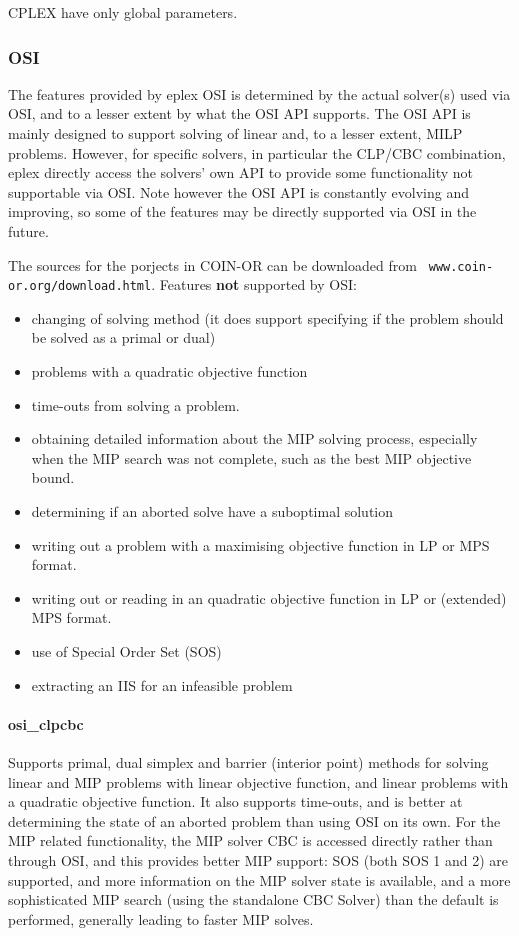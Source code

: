 CPLEX have only global parameters.
  
\subsubsection{OSI}
The features provided by eplex OSI is determined by the actual
solver(s) used via OSI, and to a lesser extent by what the OSI API
supports. The OSI API is mainly designed to support solving of 
linear and, to a lesser extent, MILP problems. However, for specific
solvers, in particular the CLP/CBC combination, eplex
directly access the solvers' own API to provide some functionality not
supportable via OSI. Note however the OSI API is constantly evolving and
improving, so some of the features may be directly supported via OSI in the
future. 

The sources for the porjects in COIN-OR can be downloaded from {\tt
www.coin-or.org/download.html}. 
Features {\bf not} supported by OSI: 
\begin{itemize}
\item changing of solving method (it does support specifying if the problem
should be solved as a primal or dual)
\item problems with a quadratic objective function
\item time-outs from solving a problem.
\item obtaining detailed information about the MIP solving process,
especially when the MIP search was not complete, such as
the best MIP objective bound.
\item determining if an aborted solve have a suboptimal solution 
\item writing out a problem with a maximising objective function in LP or
MPS format.
\item writing out or reading in an quadratic objective function in LP or (extended)
MPS format.
\item use of Special Order Set (SOS)
\item extracting an IIS for an infeasible problem
\end{itemize}

\paragraph{osi_clpcbc} Supports primal, dual simplex and barrier (interior
point) methods for
solving linear and MIP problems with linear objective function, and linear
problems with a quadratic objective function. It also supports time-outs, and is better 
at determining the state of an aborted problem than using OSI on its own.
For the MIP related functionality, the MIP solver CBC is accessed directly
rather than through OSI, and this 
provides better MIP support: SOS (both SOS 1 and 2) are supported, and more information on the MIP
solver state is available, and a more sophisticated MIP search (using the
standalone CBC Solver) than the default is performed, generally
leading to faster MIP solves.

